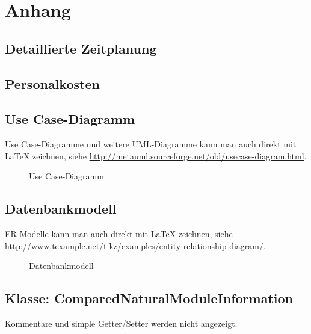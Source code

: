 \section{Anhang}
\subsection{Detaillierte Zeitplanung}
\label{app:Zeitplanung}

\subsection{Personalkosten}
\label{app:Personalkosten}

\subsection{Use Case-Diagramm}
\label{app:UseCase}
Use Case-Diagramme und weitere {UML}-Diagramme kann man auch direkt mit \LaTeX{} zeichnen, siehe \zB \url{http://metauml.sourceforge.net/old/usecase-diagram.html}.
\begin{figure}[htb]
\centering
{}
\caption{Use Case-Diagramm}
\end{figure}



\subsection{Datenbankmodell}
\label{app:Datenbankmodell}
ER-Modelle kann man auch direkt mit \LaTeX{} zeichnen, siehe \zB \url{http://www.texample.net/tikz/examples/entity-relationship-diagram/}.
\begin{figure}[htb]
\centering
{}
\caption{Datenbankmodell}
\end{figure}
\clearpage


\clearpage


\clearpage


\subsection{Klasse: ComparedNaturalModuleInformation}
\label{app:CNMI}
Kommentare und simple Getter/Setter werden nicht angezeigt.

\clearpage

